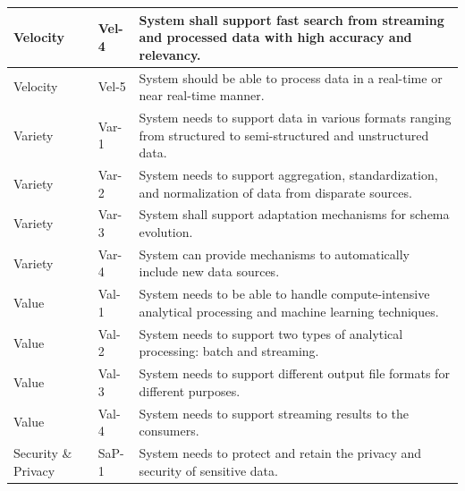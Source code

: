 \documentclass[review]{elsarticle}
\begin{document}
\begin{longtable}
\begin{tabular}{|l|l|p{10cm}|}
  \hline

  Velocity & Vel-4 & System shall support fast search from streaming and processed data with high accuracy and relevancy. \\

  \hline

  Velocity & Vel-5 & System should be able to process data in a real-time or near real-time manner. \\

  \hline

  Variety & Var-1 & System needs to support data in various formats ranging from structured to semi-structured and unstructured data. \\

  \hline

  Variety & Var-2 & System needs to support aggregation, standardization, and normalization of data from disparate sources. \\

  \hline

  Variety & Var-3 & System shall support adaptation mechanisms for schema evolution. \\

  \hline

  Variety & Var-4 & System can provide mechanisms to automatically include new data sources. \\

  \hline

  Value & Val-1 & System needs to be able to handle compute-intensive analytical processing and machine learning techniques. \\

  \hline

  Value & Val-2 & System needs to support two types of analytical processing: batch and streaming. \\

  \hline

  Value & Val-3 & System needs to support different output file formats for different purposes. \\

  \hline

  Value & Val-4 & System needs to support streaming results to the consumers. \\

  \hline

  Security \& Privacy & SaP-1 & System needs to protect and retain the privacy and security of sensitive data. \\


\end{tabular}
\end{longtable}
\end{document}
